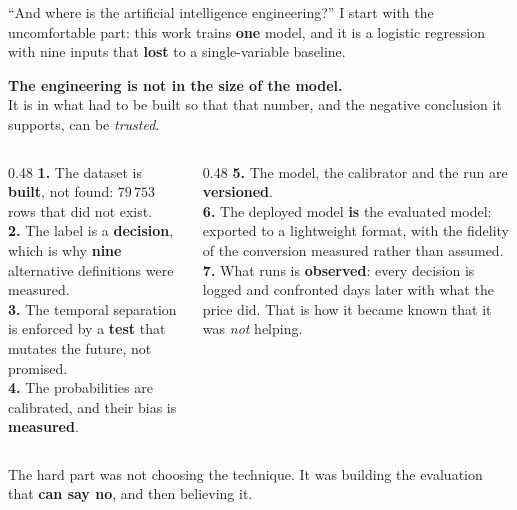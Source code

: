 \documentclass[aspectratio=169]{beamer}
\begin{document}
\begin{frame}{``And where is the artificial intelligence engineering?''}
\small
I start with the uncomfortable part: this work trains \textbf{one} model, and it is a logistic
regression with nine inputs that \textbf{lost} to a single-variable baseline.
\vspace{2mm}

\begin{center}
\textbf{The engineering is not in the size of the model.}\\
It is in what had to be built so that that number, and the negative conclusion
it supports, can be \emph{trusted}.
\end{center}
\vspace{2mm}

\begin{columns}[T]
\begin{column}{0.48\textwidth}
{\footnotesize
\textbf{1.} The dataset is \textbf{built}, not found: $79\,753$ rows that did not exist.
\\[1mm]
\textbf{2.} The label is a \textbf{decision}, which is why \textbf{nine} alternative definitions
were measured.\\[1mm]
\textbf{3.} The temporal separation is enforced by a \textbf{test} that mutates the future,
not promised.\\[1mm]
\textbf{4.} The probabilities are calibrated, and their bias is \textbf{measured}.
}
\end{column}
\begin{column}{0.48\textwidth}
{\footnotesize
\textbf{5.} The model, the calibrator and the run are \textbf{versioned}.\\[1mm]
\textbf{6.} The deployed model \textbf{is} the evaluated model: exported to a lightweight
format, with the fidelity of the conversion measured rather than assumed.\\[1mm]
\textbf{7.} What runs is \textbf{observed}: every decision is logged and confronted days later
with what the price did. That is how it became known that it was \emph{not} helping.
}
\end{column}
\end{columns}
\vspace{0.5mm}

\begin{center}
\footnotesize The hard part was not choosing the technique. It was building the evaluation that
\textbf{can say no}, and then believing it.
\end{center}
\end{frame}
\end{document}
